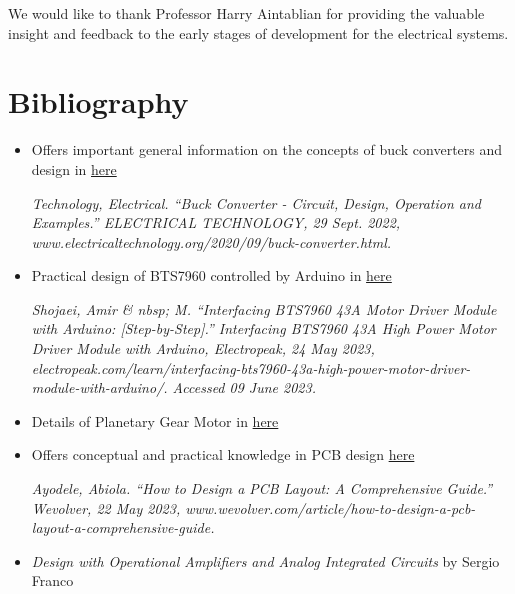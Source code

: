 \documentclass[a4paper, 10pt]{article}
\begin{document}
	We would like to thank Professor Harry Aintablian for providing the valuable insight and feedback to the early stages of development for the electrical systems. 

\section{Bibliography}
	\begin{itemize}
		\item Offers important general information on the concepts of buck converters and design in \href{https://www.electricaltechnology.org/2020/09/buck-converter.html}{here}

		\textit{Technology, Electrical. “Buck Converter - Circuit, Design, Operation and Examples.” ELECTRICAL TECHNOLOGY, 29 Sept. 2022, www.electricaltechnology.org/2020/09/buck-converter.html.} 		
		
		\item Practical design of BTS7960 controlled by Arduino in \href{https://electropeak.com/learn/interfacing-bts7960-43a-high-power-motor-driver-module-with-arduino/} {here}
		
		\textit{Shojaei, Amir \& nbsp; M. “Interfacing BTS7960 43A Motor Driver Module with Arduino: [Step-by-Step].” Interfacing BTS7960 43A High Power Motor Driver Module with Arduino, Electropeak, 24 May 2023, electropeak.com/learn/interfacing-bts7960-43a-high-power-motor-driver-module-with-arduino/. Accessed 09 June 2023.} 
		
		\item Details of Planetary Gear Motor in \href{https://www.servocity.com/content/downloads/118_rpm_hd_precision_planetary_gearmotor_-_specifications_1.pdf} {here}
		
		
		\item Offers conceptual and practical knowledge in PCB design \href{https://www.wevolver.com/article/how-to-design-a-pcb-layout-a-comprehensive-guide} {here}
				
		\textit{Ayodele, Abiola. “How to Design a PCB Layout: A Comprehensive Guide.” Wevolver, 22 May 2023, www.wevolver.com/article/how-to-design-a-pcb-layout-a-comprehensive-guide.}
		
		\item \textit{Design with Operational Amplifiers and Analog Integrated Circuits} by Sergio Franco
		

\end{itemize}
\end{document}
